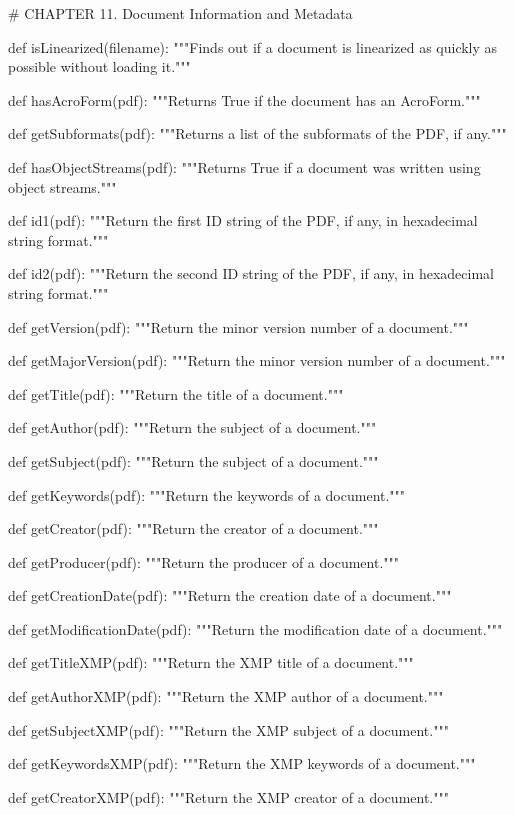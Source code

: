 # CHAPTER 11. Document Information and Metadata

def isLinearized(filename):
    """Finds out if a document is linearized as quickly as possible without
    loading it."""

def hasAcroForm(pdf):
    """Returns True if the document has an AcroForm."""

def getSubformats(pdf):
    """Returns a list of the subformats of the PDF, if any."""

def hasObjectStreams(pdf):
    """Returns True if a document was written using object streams."""

def id1(pdf):
    """Return the first ID string of the PDF, if any, in hexadecimal string
    format."""

def id2(pdf):
    """Return the second ID string of the PDF, if any, in hexadecimal string
    format."""

def getVersion(pdf):
    """Return the minor version number of a document."""

def getMajorVersion(pdf):
    """Return the minor version number of a document."""

def getTitle(pdf):
    """Return the title of a document."""

def getAuthor(pdf):
    """Return the subject of a document."""

def getSubject(pdf):
    """Return the subject of a document."""

def getKeywords(pdf):
    """Return the keywords of a document."""

def getCreator(pdf):
    """Return the creator of a document."""

def getProducer(pdf):
    """Return the producer of a document."""

def getCreationDate(pdf):
    """Return the creation date of a document."""

def getModificationDate(pdf):
    """Return the modification date of a document."""

def getTitleXMP(pdf):
    """Return the XMP title of a document."""

def getAuthorXMP(pdf):
    """Return the XMP author of a document."""

def getSubjectXMP(pdf):
    """Return the XMP subject of a document."""

def getKeywordsXMP(pdf):
    """Return the XMP keywords of a document."""

def getCreatorXMP(pdf):
    """Return the XMP creator of a document."""

